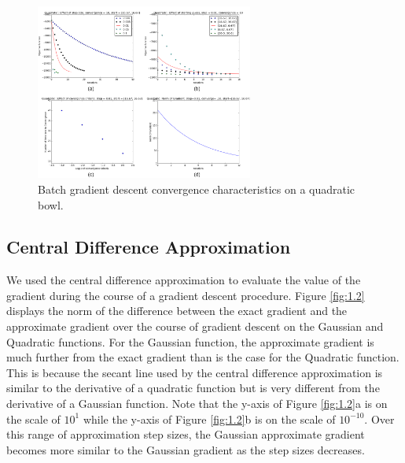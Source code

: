 \documentclass[10pt, twocolumn]{article}
\begin{document}
\begin{figure}
\caption{Batch gradient descent convergence characteristics on a quadratic bowl.}
\begin{center}
\includegraphics[width=270px]{all_quadratic_gd}
\end{center}
\label{fig:1.1_quad}
\end{figure}


\subsection{Central Difference Approximation}

 We used the central difference approximation to evaluate the value of the gradient during the course of a gradient descent procedure. Figure \ref{fig:1.2} displays the norm of the difference between the exact gradient and the approximate gradient over the course of gradient descent on the Gaussian and Quadratic functions. For the Gaussian function, the approximate gradient is much further from the exact gradient than is the case for the Quadratic function. This is because the secant line used by the central difference approximation is similar to the derivative of a quadratic function but is very different from the derivative of a Gaussian function. Note that the y-axis of Figure \ref{fig:1.2}a is on the scale of $10^1$ while the y-axis of Figure \ref{fig:1.2}b is on the scale of $10^{-10}$. Over this range of approximation step sizes, the Gaussian approximate gradient becomes more similar to the Gaussian gradient as the step sizes decreases. %
\end{document}
